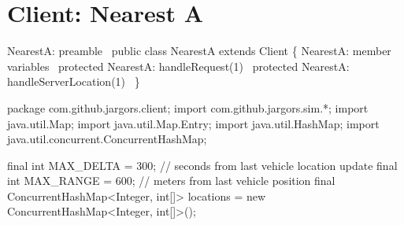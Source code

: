 \nwenddocs{}\chapter{Client: Nearest A}
\label{client-nearest-a}

\nwenddocs{}\endmoddef\nwstartdeflinemarkup\nwenddeflinemarkup
\LA{}NearestA: preamble~{\nwtagstyle{}}\RA{}
public class NearestA extends Client \{
  \LA{}NearestA: member variables~{\nwtagstyle{}}\RA{}
  protected \LA{}NearestA: handleRequest(1)~{\nwtagstyle{}}\RA{}
  protected \LA{}NearestA: handleServerLocation(1)~{\nwtagstyle{}}\RA{}
\}
\nwendcode{}\nwdocspar

\nwenddocs{}\endmoddef\nwstartdeflinemarkup{}\nwenddeflinemarkup
package com.github.jargors.client;
import com.github.jargors.sim.*;
import java.util.Map;
import java.util.Map.Entry;
import java.util.HashMap;
import java.util.concurrent.ConcurrentHashMap;
\nwendcode{}\nwdocspar

\nwenddocs{}\endmoddef\nwstartdeflinemarkup{}\nwenddeflinemarkup
final int MAX_DELTA = 300;  // seconds from last vehicle location update
final int MAX_RANGE = 600;  // meters from last vehicle position
final ConcurrentHashMap<Integer, int[]> locations =
  new ConcurrentHashMap<Integer, int[]>();
\nwendcode{}\nwdocspar

